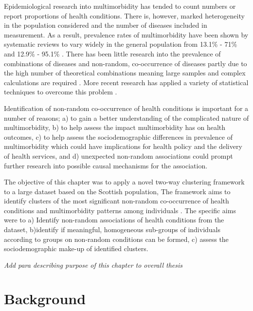 \documentclass[12pt,]{report}
\begin{document}
Epidemiological research into multimorbidity has tended to count numbers
or report proportions of health conditions. There is, however, marked
heterogeneity in the population considered and the number of diseases
included in measurement. As a result, prevalence rates of multimorbidity
have been shown by systematic reviews to vary widely in the general
population from 13.1\% - 71\% \citep{RN56} and 12.9\% - 95.1\%
\citep{RN15}. There has been little research into the prevalence of
combinations of diseases and non-random, co-occurrence of diseases
partly due to the high number of theoretical combinations meaning large
samples and complex calculations are required \citep{RN91, RN187}. More
recent research has applied a variety of statistical techniques to
overcome this problem \citep{RN98}.

Identification of non-random co-occurrence of health conditions is
important for a number of reasons; a) to gain a better understanding of
the complicated nature of multimorbidity, b) to help assess the impact
multimorbidity has on health outcomes, c) to help assess the
sociodemographic differences in prevalence of multimorbidity which could
have implications for health policy and the delivery of health services,
and d) unexpected non-random associations could prompt further research
into possible causal mechanisms for the association.

The objective of this chapter was to apply a novel two-way clustering
framework to a large dataset based on the Scottish population, The
framework aims to identify clusters of the most significant non-random
co-occurrence of health conditions and multimorbidity patterns among
individuals \citep{RN72}. The specific aims were to a) Identify
non-random associations of health conditions from the dataset,
b)identify if meaningful, homogeneous sub-groups of individuals
according to groups on non-random conditions can be formed, c) assess
the sociodemographic make-up of identified clusters.

\emph{Add para describing purpose of this chapter to overall thesis}

\section{Background}\label{sec:clust-background}
\end{document}
